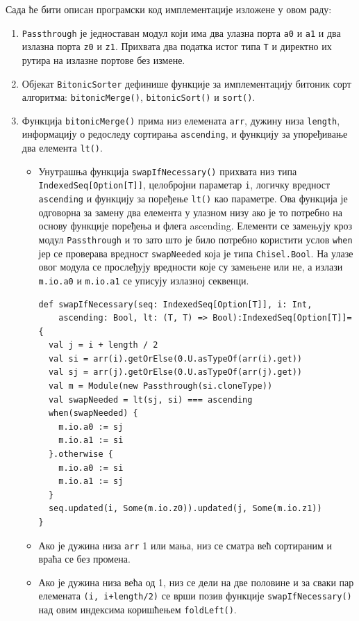 \documentclass[12pt, a4paper]{article}
\theoremstyle{definition}
\begin{document}
Сада ће бити описан програмски код имплементације изложене у овом раду:
\begin{enumerate}
\item \verb+Passthrough+ је једноставан модул који има два улазна порта \verb+a0+ и \verb+a1+ и два излазна порта \verb+z0+ и \verb+z1+. Прихвата два податка истог типа \verb+T+ и директно их рутира на излазне портове без измене.

\item Објекат \verb+BitonicSorter+ дефинише функције за имплементацију битоник сорт алгоритма: \verb+bitonicMerge()+, \verb+bitonicSort()+ и \verb+sort()+.

\item Функција \verb+bitonicMerge()+ прима низ елемената \verb+arr+, дужину низа \verb+length+, информацију о редоследу сортирања \verb+ascending+, и функцију за упоређивање два елемента \verb+lt()+.
\begin{itemize}
\item Унутрашња функција \verb+swapIfNecessary()+ прихвата низ типа \verb+IndexedSeq[Option[T]]+, целобројни параметар \verb+i+, логичку вредност \verb+ascending+ и функцију за поређење \verb+lt()+ као параметре.
Ова функција је одговорна за замену два елемента у улазном низу ако је то потребно на основу функције поређења и флега ascending. Елементи се замењују кроз модул \verb+Passthrough+ и то зато што је било потребно користити услов \verb+when+ јер се проверава вредност \verb+swapNeeded+ која је типа \verb+Chisel.Bool+. На улазе овог модула се прослеђују вредности које су замењене или не, а излази \verb+m.io.a0+ и \verb+m.io.a1+ се уписују излазној секвенци.
\begin{verbatim}
def swapIfNecessary(seq: IndexedSeq[Option[T]], i: Int,
    ascending: Bool, lt: (T, T) => Bool):IndexedSeq[Option[T]]={
  val j = i + length / 2
  val si = arr(i).getOrElse(0.U.asTypeOf(arr(i).get))
  val sj = arr(j).getOrElse(0.U.asTypeOf(arr(j).get))
  val m = Module(new Passthrough(si.cloneType))
  val swapNeeded = lt(sj, si) === ascending
  when(swapNeeded) {
    m.io.a0 := sj
    m.io.a1 := si
  }.otherwise {
    m.io.a0 := si
    m.io.a1 := sj
  }
  seq.updated(i, Some(m.io.z0)).updated(j, Some(m.io.z1))
}
\end{verbatim}
\item Ако је дужина низа \verb+arr+ 1 или мања, низ се сматра већ сортираним и враћа се без промена.
\item Ако је дужина низа већа од 1, низ се дели на две половине и за сваки пар елемената \verb-(i, i+length/2)- се врши позив функције \verb+swapIfNecessary()+ над овим индексима коришћењем \verb+foldLeft()+.

\end{itemize}
\end{enumerate}
\end{document}
